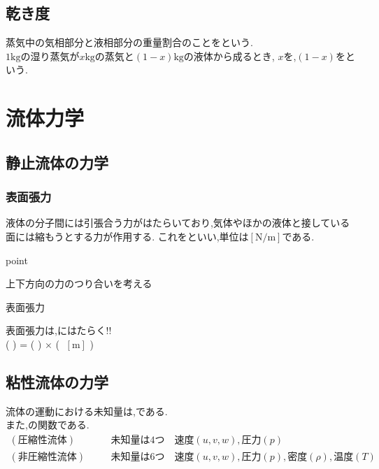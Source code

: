 \documentclass[a4paper]{jsarticle}
\begin{document}
\subsection{乾き度}
蒸気中の気相部分と液相部分の重量割合のことをという.\\
$1\mathrm{kg}$の湿り蒸気が$x\mathrm{kg}$の蒸気と$\left(1-x\right)\mathrm{kg}$の液体から成るとき,
$x$を,$\left(1-x\right)$をという.
\newpage
\section{流体力学}
\subsection{静止流体の力学}
\subsubsection{表面張力}
液体の分子間には引張合う力がはたらいており,気体やほかの液体と接している面には縮もうとする力が作用する.
これをといい,単位は$\left[\mathrm{N/m}\right]$である.
\begin{itembox}[l]{point}
    \begin{center}
        上下方向の力のつり合いを考える\\
    \end{center}
\end{itembox}
\begin{itembox}[l]{表面張力}
    \begin{center}
        表面張力は,にはたらく!!\\
        (  ) = ( ) $\times$ ( $\;\left[\mathrm{m}\right]$ )
    \end{center}
\end{itembox}
\subsection{粘性流体の力学}
流体の運動における未知量は,である.\\
また,の関数である.\\
\begin{eqnarray*}
    (圧縮性流体)&&\quad 未知量は4つ\quad 速度\left(u,v,w\right),圧力\left(p\right)\\
    (非圧縮性流体)&&\quad 未知量は6つ\quad 速度\left(u,v,w\right),圧力\left(p\right),密度\left(\rho\right),温度\left(T\right)\\
\end{eqnarray*}
\end{document}
